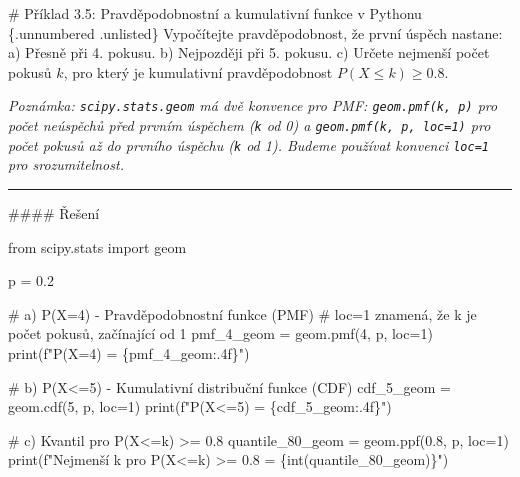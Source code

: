 \documentclass[
  czech,
  11pt,
  letterpaper,
  DIV=11,
  numbers=noendperiod]{scrreprt}
\newenvironment{Shaded}{\begin{snugshade}}{\end{snugshade}}
\newcommand{\BuiltInTok}[1]{\textcolor[rgb]{0.00,0.23,0.31}{#1}}
\newcommand{\CommentTok}[1]{\textcolor[rgb]{0.37,0.37,0.37}{#1}}
\newcommand{\DecValTok}[1]{\textcolor[rgb]{0.68,0.00,0.00}{#1}}
\newcommand{\FloatTok}[1]{\textcolor[rgb]{0.68,0.00,0.00}{#1}}
\newcommand{\ImportTok}[1]{\textcolor[rgb]{0.00,0.46,0.62}{#1}}
\newcommand{\NormalTok}[1]{\textcolor[rgb]{0.00,0.23,0.31}{#1}}
\newcommand{\OperatorTok}[1]{\textcolor[rgb]{0.37,0.37,0.37}{#1}}
\newcommand{\SpecialCharTok}[1]{\textcolor[rgb]{0.37,0.37,0.37}{#1}}
\newcommand{\SpecialStringTok}[1]{\textcolor[rgb]{0.13,0.47,0.30}{#1}}
\begin{document}
\begin{tcolorbox}[enhanced jigsaw, arc=.35mm, bottomrule=.15mm, bottomtitle=1mm, breakable, colback=white, colbacktitle=quarto-callout-note-color!10!white, colframe=quarto-callout-note-color-frame, coltitle=black, left=2mm, leftrule=.75mm, opacityback=0, opacitybacktitle=0.6, rightrule=.15mm, title=\textcolor{quarto-callout-note-color}{\faInfo}\hspace{0.5em}{Poznámka}, titlerule=0mm, toprule=.15mm, toptitle=1mm]

\# Příklad 3.5: Pravděpodobnostní a kumulativní funkce v Pythonu
\{.unnumbered .unlisted\} Vypočítejte pravděpodobnost, že první úspěch
nastane: a) Přesně při 4. pokusu. b) Nejpozději při 5. pokusu. c) Určete
nejmenší počet pokusů \(k\), pro který je kumulativní pravděpodobnost
\(P(X \le k) \ge 0.8\).

\emph{Poznámka: \texttt{scipy.stats.geom} má dvě konvence pro PMF:
\texttt{geom.pmf(k,\ p)} pro počet neúspěchů před prvním úspěchem
(\texttt{k} od 0) a \texttt{geom.pmf(k,\ p,\ loc=1)} pro počet pokusů až
do prvního úspěchu (\texttt{k} od 1). Budeme používat konvenci
\texttt{loc=1} pro srozumitelnost.}

\begin{center}\rule{0.5\linewidth}{0.5pt}\end{center}

\#\#\#\# Řešení

\begin{Shaded}
\begin{Highlighting}[]
\ImportTok{from}\NormalTok{ scipy.stats }\ImportTok{import}\NormalTok{ geom}

\NormalTok{p }\OperatorTok{=} \FloatTok{0.2}

\CommentTok{\# a) P(X=4) {-} Pravděpodobnostní funkce (PMF)}
\CommentTok{\# loc=1 znamená, že k je počet pokusů, začínající od 1}
\NormalTok{pmf\_4\_geom }\OperatorTok{=}\NormalTok{ geom.pmf(}\DecValTok{4}\NormalTok{, p, loc}\OperatorTok{=}\DecValTok{1}\NormalTok{)}
\BuiltInTok{print}\NormalTok{(}\SpecialStringTok{f"P(X=4) = }\SpecialCharTok{\{}\NormalTok{pmf\_4\_geom}\SpecialCharTok{:.4f\}}\SpecialStringTok{"}\NormalTok{)}

\CommentTok{\# b) P(X\textless{}=5) {-} Kumulativní distribuční funkce (CDF)}
\NormalTok{cdf\_5\_geom }\OperatorTok{=}\NormalTok{ geom.cdf(}\DecValTok{5}\NormalTok{, p, loc}\OperatorTok{=}\DecValTok{1}\NormalTok{)}
\BuiltInTok{print}\NormalTok{(}\SpecialStringTok{f"P(X\textless{}=5) = }\SpecialCharTok{\{}\NormalTok{cdf\_5\_geom}\SpecialCharTok{:.4f\}}\SpecialStringTok{"}\NormalTok{)}

\CommentTok{\# c) Kvantil pro P(X\textless{}=k) \textgreater{}= 0.8}
\NormalTok{quantile\_80\_geom }\OperatorTok{=}\NormalTok{ geom.ppf(}\FloatTok{0.8}\NormalTok{, p, loc}\OperatorTok{=}\DecValTok{1}\NormalTok{)}
\BuiltInTok{print}\NormalTok{(}\SpecialStringTok{f"Nejmenší k pro P(X\textless{}=k) \textgreater{}= 0.8 = }\SpecialCharTok{\{}\BuiltInTok{int}\NormalTok{(quantile\_80\_geom)}\SpecialCharTok{\}}\SpecialStringTok{"}\NormalTok{)}
\end{Highlighting}
\end{Shaded}

\end{tcolorbox}
\end{document}
